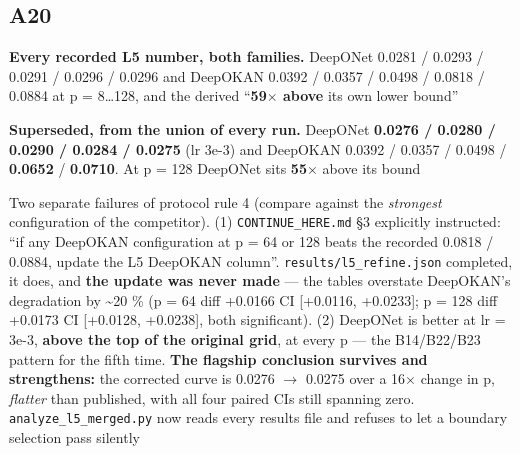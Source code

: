 \documentclass[10pt]{article}
\begin{document}
\subsection*{A20}\label{led:A20}
\begin{description}[leftmargin=0pt,itemsep=1pt]
\item[Claim withdrawn.] \textbf{Every recorded L5 number, both families.} DeepONet 0.0281 / 0.0293 / 0.0291 / 0.0296 / 0.0296 and DeepOKAN 0.0392 / 0.0357 / 0.0498 / 0.0818 / 0.0884 at p = 8\ldots{}128, and the derived ``\textbf{59$\times$ above} its own lower bound''
\item[Replaced with.] \textbf{Superseded, from the union of every run.} DeepONet \textbf{0.0276 / 0.0280 / 0.0290 / 0.0284 / 0.0275} (lr 3e-3) and DeepOKAN 0.0392 / 0.0357 / 0.0498 / \textbf{0.0652} / \textbf{0.0710}. At p = 128 DeepONet sits \textbf{55$\times$} above its bound
\item[Why it was wrong.] Two separate failures of protocol rule 4 (compare against the \emph{strongest} configuration of the competitor). (1) \texttt{CONTINUE\_HERE.md} §3 explicitly instructed: ``if any DeepOKAN configuration at p = 64 or 128 beats the recorded 0.0818 / 0.0884, update the L5 DeepOKAN column''. \texttt{results/l5\_refine.json} completed, it does, and \textbf{the update was never made} --- the tables overstate DeepOKAN's degradation by \textasciitilde{}20 \% (p = 64 diff +0.0166 CI [+0.0116, +0.0233]; p = 128 diff +0.0173 CI [+0.0128, +0.0238], both significant). (2) DeepONet is better at lr = 3e-3, \textbf{above the top of the original grid}, at every p --- the B14/B22/B23 pattern for the fifth time. \textbf{The flagship conclusion survives and strengthens:} the corrected curve is 0.0276 $\rightarrow$ 0.0275 over a 16$\times$ change in p, \emph{flatter} than published, with all four paired CIs still spanning zero. \texttt{analyze\_l5\_merged.py} now reads every results file and refuses to let a boundary selection pass silently
\end{description}
\end{document}
